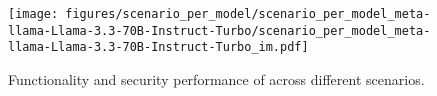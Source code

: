 
\begin{figure}[h]
    \centering
    \texttt{[image: figures/scenario\_per\_model/scenario\_per\_model\_meta-llama-Llama-3.3-70B-Instruct-Turbo/scenario\_per\_model\_meta-llama-Llama-3.3-70B-Instruct-Turbo\_im.pdf]}
    \caption{Functionality and security performance of \llamat{} across different scenarios.}
    \label{fig:scenario_per_model_meta-llama-Llama-3.3-70B-Instruct-Turbo}
\end{figure}
